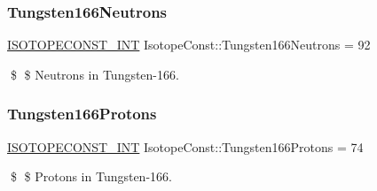 \subsubsection{\texorpdfstring{Tungsten166\+Neutrons}{Tungsten166Neutrons}}
{\footnotesize\ttfamily \mbox{\hyperlink{group___isotope_const-_macros_ga5f18360b3e99483a35c32d789e62621c}{I\+S\+O\+T\+O\+P\+E\+C\+O\+N\+S\+T\+\_\+\+I\+NT}} Isotope\+Const\+::\+Tungsten166\+Neutrons = 92}

\$ \$ Neutrons in Tungsten-\/166. \mbox{\label{group___isotope_const-_tungsten-_w166_ga7e3114f9051bd3940b377ff1763811cf}} 
\subsubsection{\texorpdfstring{Tungsten166\+Protons}{Tungsten166Protons}}
{\footnotesize\ttfamily \mbox{\hyperlink{group___isotope_const-_macros_ga5f18360b3e99483a35c32d789e62621c}{I\+S\+O\+T\+O\+P\+E\+C\+O\+N\+S\+T\+\_\+\+I\+NT}} Isotope\+Const\+::\+Tungsten166\+Protons = 74}

\$ \$ Protons in Tungsten-\/166. 
